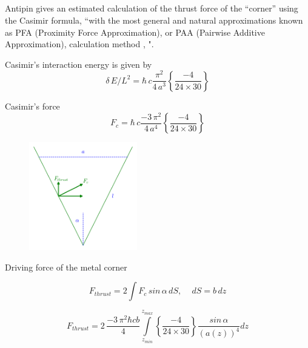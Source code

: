 \documentclass[twoside, 10pt]{article}
\begin{document}
\begin{multicols}{2}

    \section*{}\label{appendix-d.-the-derivation-of-the-thrust-formula-for-the-honeycomb-basing-on-the-antipin-formula-for-the-thrust-of-a-metal-angle}
\vspace{-3.5mm}

    Antipin \cite{Antipin2012} gives an estimated calculation of the thrust
force of the ``corner'' using the Casimir formula, ``with the most
general and natural approximations known as PFA (Proximity Force
Approximation), or PAA (Pairwise Additive Approximation), calculation
method \cite{Intravaia2013}, \cite{Rodriguez2011}".

Casimir's interaction energy is given by
\[\delta\,E/L^2 = \hbar\,c\frac{\pi^2}{4\,a^3}\left\{\frac{-4}{24\times30}\right\}\]

Casimir's force
\[F_{c} = \hbar\,c\frac{-3\,\pi^2}{4\,a^4}\left\{\frac{-4}{24\times30}\right\}\]


\begin{figure}
\begin{center}
\includegraphics[width=0.42\textwidth]{Antipins_angle_en.png}
\caption{}{}
\end{center}
\label{fig:Antipins_angle}
\end{figure}

Driving force of the metal corner

\[F_{thrust} = 2 \int F_{c} \, sin\, \alpha \,dS, \,\,\,\,\,\,\, dS = b\,dz\]


\[F_{thrust} = 2\, \frac{-3\,\pi^2\hbar c b}{4}\int\limits_{z_{min}}^{z_{max}} \left\{\frac{-4}{24\times30}\right\}\frac{sin\, \alpha}{\left(a\left(z\right)\right)^4}dz\]


\end{multicols}
\end{document}

